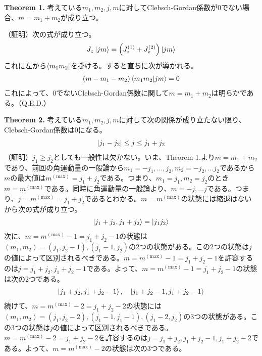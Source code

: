 \documentclass[dvipdfmx]{jarticle}
\theoremstyle{plain}
\begin{document}
\begin{enumerate}
    \textbf{Theorem 1.} 考えている$m_1, m_2, j, m$に対してClebsch-Gordan係数が0でない場合、$m = m_1 + m_2$が成り立つ。

    （証明）次の式が成り立つ。
    \begin{align}
      J_z\ket{jm} = \qty(J^{(1)}_z + J^{(2)}_z)\ket{jm}
    \end{align}
    これに左から$\bra{m_1m_2}$を掛ける。すると直ちに次が導かれる。
    \begin{align}
      \qty(m - m_1 - m_2)\bra{m_1m_2}\ket{jm} = 0
    \end{align}
    これによって、0でないClebsch-Gordan係数に関して$m = m_1 + m_2$は明らかである。\hfill （Q.E.D.）

    
    \textbf{Theorem 2.} 考えている$m_1, m_2, j, m$に対して次の関係が成り立たない限り、Clebsch-Gordan係数は0になる。
    \begin{align}
      \qty|j_1 - j_2| \leq j \leq j_1 + j_2
    \end{align}
        （証明）$j_1 \geq j_2$としても一般性は欠かない。いま、Theorem 1.より$m = m_1 + m_2$であり、前回の角運動量の一般論から$m_1 = -j_1, \dots , j_2, m_2 = -j_2, \dots j_2$であるから$m$の最大値は$m^{(\mathrm{max})} = j_1 + j_2$である。つまり、$m_1 = j_1, m_2 = j_2$のとき$m = m^{(\mathrm{max})}$である。同時に角運動量の一般論より、$m = -j ,\dots j$である。つまり、$j = m^{\mathrm{(max)}} = j_1 + j_2$であるとわかる。$m = m^{(\mathrm{max})}$の状態には縮退はないから次の式が成り立つ。
        \begin{align}
          \ket{j_1 + j_2, j_1 + j_2} = \ket{j_1j_2}
        \end{align}
        次に、$m = m^{(\mathrm{max})} - 1 = j_1 + j_2 - 1$の状態は$(m_1, m_2) = (j_1, j_2 - 1), (j_1 - 1, j_2)$の2つの状態がある。この2つの状態は$j$の値によって区別されるべきである。$m = m^{(\mathrm{max})} - 1 = j_1 + j_2 - 1$を許容するのは$j = j_1 + j_2, j_1 + j_2 - 1$である。よって、$m = m^{(\mathrm{max})} - 1 = j_1 + j_2 - 1$の状態は次の2つである。
        \begin{align}
          \ket{j_1 + j_2, j_1 + j_2 - 1}, \quad \ket{j_1 + j_2 - 1, j_1 + j_2 - 1}
        \end{align}
        続けて、$m = m^{(\mathrm{max})} - 2 = j_1 + j_2 - 2$の状態には$(m_1, m_2) = (j_1, j_2 - 2), (j_1 - 1, j_1 - 1), (j_1 - 2, j_2)$の3つの状態がある。この3つの状態は$j$の値によって区別されるべきである。$m = m^{(\mathrm{max})} - 2 = j_1 + j_2 - 2$を許容するのは$j = j_1 + j_2, j_1 + j_2 - 1, j_1 + j_2 - 2$である。よって、$m = m^{\mathrm{(max)}} - 2$の状態は次の3つである。

\end{enumerate}
\end{document}
